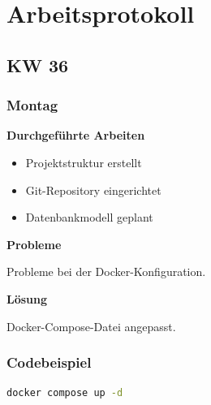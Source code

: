\documentclass[
    12pt,
    a4paper
]{article}
\begin{document}
\newpage
\section{Arbeitsprotokoll}

\subsection{KW 36}

\subsubsection{Montag}

\textbf{Durchgeführte Arbeiten}

\begin{itemize}
    \item Projektstruktur erstellt
    \item Git-Repository eingerichtet
    \item Datenbankmodell geplant
\end{itemize}

\textbf{Probleme}

Probleme bei der Docker-Konfiguration.

\textbf{Lösung}

Docker-Compose-Datei angepasst.

\subsubsection{Codebeispiel}

\begin{lstlisting}[language=bash]
docker compose up -d
\end{lstlisting}

%
\end{document}
